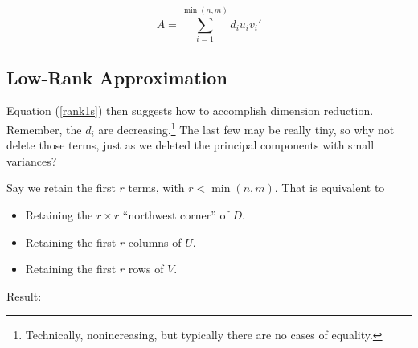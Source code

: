 \begin{equation}
\label{rank1s}
A = \sum_{i=1}^{\min(n,m)} d_i  u_i v_i'
\end{equation}

% 

\subsection{Low-Rank Approximation}

Equation (\ref{rank1s}) then suggests how to accomplish dimension
reduction.  Remember, the $d_i$ are decreasing.\footnote{Technically,
nonincreasing, but typically there are no cases of equality.}  The last
few may be really tiny, so why not delete those terms, just as we
deleted the principal components with small variances?

Say we retain the first $r$ terms, with $r < \min(n,m)$.  That is
equivalent to

\begin{itemize}

\item Retaining the $r \times r$ ``northwest corner'' of $D$.

\item Retaining the first $r$ columns of $U$.

\item Retaining the first $r$ rows of $V$.

\end{itemize} 

Result:

